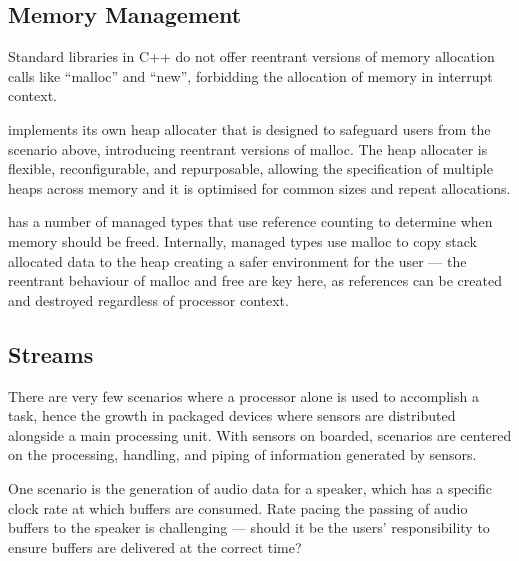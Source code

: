 
\subsection{Memory Management}

Standard libraries in C++ do not offer reentrant versions of memory allocation calls like ``malloc'' and ``new'', forbidding the allocation of memory in interrupt context.

\CO implements its own heap allocater that is designed to safeguard users from the scenario above, introducing reentrant versions of malloc. The heap allocater is flexible, reconfigurable, and repurposable, allowing the specification of multiple heaps across memory and it is optimised for common sizes and repeat allocations.

\CO has a number of managed types that use reference counting to determine when memory should be freed. Internally, managed types use malloc to copy stack allocated data to the heap creating a safer environment for the user --- the reentrant behaviour of malloc and free are key here, as references can be created and destroyed regardless of processor context.

\subsection{Streams}
There are very few scenarios where a processor alone is used to accomplish a task, hence the growth in packaged devices where sensors are distributed alongside a main processing unit. With sensors on boarded, scenarios are centered on the processing, handling, and piping of information generated by sensors.

One scenario is the generation of audio data for a speaker, which has a specific clock rate at which buffers are consumed. Rate pacing the passing of audio buffers to the speaker is challenging --- should it be the users' responsibility to ensure buffers are delivered at the correct time?

